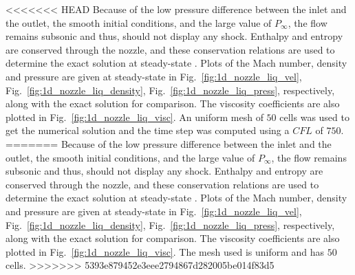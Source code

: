 \documentclass[preprint,10pt]{elsarticle}
\newcommand{\fig}[1]{Fig.~\ref{#1}}                      %
\begin{document}
<<<<<<< HEAD
Because of the low pressure difference between the inlet and the outlet, the smooth initial conditions, and the large value of $P_{\infty}$, the flow remains subsonic and thus, should not display any shock. Enthalpy and entropy are conserved through the nozzle, and these conservation relations are used to determine the exact solution at steady-state \cite{nozzle_exact}.
Plots of the Mach number, density and pressure are given at steady-state in \fig{fig:1d_nozzle_liq_vel}, \fig{fig:1d_nozzle_liq_density}, \fig{fig:1d_nozzle_liq_press}, respectively, along with the exact solution for comparison. The viscosity coefficients are also plotted in \fig{fig:1d_nozzle_liq_visc}. An uniform mesh of $50$ cells was used to get the numerical solution and the time step was computed using a $CFL$ of $750$.
=======
Because of the low pressure difference between the inlet and the outlet, the smooth initial conditions, and the large value of $P_\infty$, the flow remains subsonic and thus, should not display any shock. Enthalpy and entropy are conserved through the nozzle, and these conservation relations are used to determine the exact solution at steady-state \cite{nozzle_exact}.
Plots of the Mach number, density and pressure are given at steady-state in \fig{fig:1d_nozzle_liq_vel}, \fig{fig:1d_nozzle_liq_density}, \fig{fig:1d_nozzle_liq_press}, respectively, along with the exact solution for comparison. The viscosity coefficients are also plotted in \fig{fig:1d_nozzle_liq_visc}. The mesh used is uniform and has $50$ cells.
>>>>>>> 5393e879452e3eee2794867d282005be014f83d5
\end{document}
